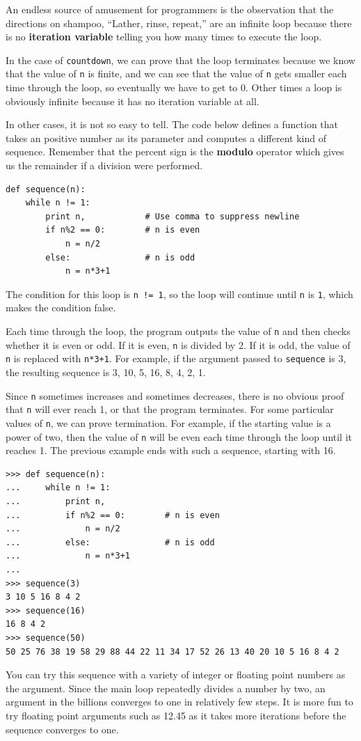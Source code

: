 \documentclass[10pt]{book}
\begin{document}
An endless source of amusement for 
programmers is the observation that the directions on shampoo,
``Lather, rinse, repeat,'' are an infinite loop because 
there is no {\bf iteration variable} telling you how many times
to execute the loop.


In the case of {\tt countdown}, we can prove that the loop
terminates because we know that the value of {\tt n} is finite, and we
can see that the value of {\tt n} gets smaller each time through the
loop, so eventually we have to get to 0.  Other times a loop is obviously
infinite because it has no iteration variable at all.

In other cases, it is not so easy to tell.  The code below defines a function
that takes an positive number as its parameter and computes a different 
kind of sequence.
Remember that the percent sign is the {\bf modulo} operator which gives us the
remainder if a division were performed.

\beforeverb
\begin{verbatim}
def sequence(n):
    while n != 1:
        print n,            # Use comma to suppress newline
        if n%2 == 0:        # n is even
            n = n/2
        else:               # n is odd
            n = n*3+1
\end{verbatim}
\afterverb
%
The condition for this loop is {\tt n != 1}, so the loop will continue
until {\tt n} is {\tt 1}, which makes the condition false.

Each time through the loop, the program outputs the value of {\tt n}
and then checks whether it is even or odd.  If it is even, {\tt n} is 
divided by 2.  If it is odd, the value of {\tt n} is replaced with
{\tt n*3+1}. For example, if the argument passed
to {\tt sequence} is 3, the resulting sequence is 3, 10, 5, 16, 8, 4, 2, 1.

Since {\tt n} sometimes increases and sometimes decreases, there is no
obvious proof that {\tt n} will ever reach 1, or that the program
terminates.  For some particular values of {\tt n}, we can prove
termination.  For example, if the starting value is a power of two,
then the value of {\tt n} will be even each time through the loop
until it reaches 1. The previous example ends with such a sequence,
starting with 16.

\beforeverb
\begin{verbatim}
>>> def sequence(n):
...     while n != 1:
...         print n,
...         if n%2 == 0:        # n is even
...             n = n/2
...         else:               # n is odd
...             n = n*3+1
... 
>>> sequence(3)
3 10 5 16 8 4 2
>>> sequence(16)
16 8 4 2
>>> sequence(50)
50 25 76 38 19 58 29 88 44 22 11 34 17 52 26 13 40 20 10 5 16 8 4 2
\end{verbatim}
\afterverb
%
You can try this sequence with a variety of integer or floating 
point numbers as the argument.  
Since the main loop repeatedly divides a number
by two, an argument in the billions converges to one in 
relatively few steps.  
It is more fun to try floating point arguments 
such as 12.45 as it takes more iterations before the sequence
converges to one.
\end{document}
